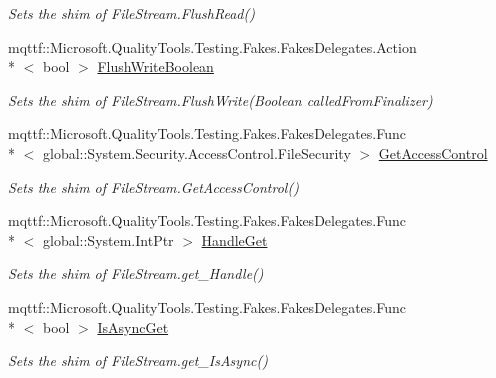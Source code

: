 \begin{DoxyCompactItemize}
\begin{DoxyCompactList}\small\item\em Sets the shim of File\-Stream.\-Flush\-Read()\end{DoxyCompactList}\item 
mqttf\-::\-Microsoft.\-Quality\-Tools.\-Testing.\-Fakes.\-Fakes\-Delegates.\-Action\\*
$<$ bool $>$ \hyperlink{class_system_1_1_i_o_1_1_fakes_1_1_shim_file_stream_a98e23ef4fc9c7cea5aa6d71c7ac5d1d2}{Flush\-Write\-Boolean}
\begin{DoxyCompactList}\small\item\em Sets the shim of File\-Stream.\-Flush\-Write(\-Boolean called\-From\-Finalizer)\end{DoxyCompactList}\item 
mqttf\-::\-Microsoft.\-Quality\-Tools.\-Testing.\-Fakes.\-Fakes\-Delegates.\-Func\\*
$<$ global\-::\-System.\-Security.\-Access\-Control.\-File\-Security $>$ \hyperlink{class_system_1_1_i_o_1_1_fakes_1_1_shim_file_stream_a82082f6a27aa23790709a8d9a552fe04}{Get\-Access\-Control}
\begin{DoxyCompactList}\small\item\em Sets the shim of File\-Stream.\-Get\-Access\-Control()\end{DoxyCompactList}\item 
mqttf\-::\-Microsoft.\-Quality\-Tools.\-Testing.\-Fakes.\-Fakes\-Delegates.\-Func\\*
$<$ global\-::\-System.\-Int\-Ptr $>$ \hyperlink{class_system_1_1_i_o_1_1_fakes_1_1_shim_file_stream_a28450ee11e491e9aee35a711f81306e2}{Handle\-Get}
\begin{DoxyCompactList}\small\item\em Sets the shim of File\-Stream.\-get\-\_\-\-Handle()\end{DoxyCompactList}\item 
mqttf\-::\-Microsoft.\-Quality\-Tools.\-Testing.\-Fakes.\-Fakes\-Delegates.\-Func\\*
$<$ bool $>$ \hyperlink{class_system_1_1_i_o_1_1_fakes_1_1_shim_file_stream_ac418fc0c719af04e0e81bcda81c4fd2a}{Is\-Async\-Get}
\begin{DoxyCompactList}\small\item\em Sets the shim of File\-Stream.\-get\-\_\-\-Is\-Async()\end{DoxyCompactList}\item 

\end{DoxyCompactItemize}
